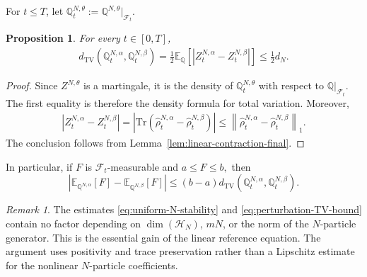 \documentclass[10pt,a4paper,reqno]{amsart}
\numberwithin{equation}{section}
\theoremstyle{plain}
\newtheorem{proposition}[theorem]{Proposition}
\theoremstyle{definition}
\theoremstyle{remark}
\newtheorem{remark}[theorem]{Remark}
\newcommand{\Tr}{\mathrm{Tr}}
\newcommand{\E}{\mathbb E}
\newcommand{\Q}{\mathbb Q}
\newcommand{\cF}{\mathcal F}
\newcommand{\HH}{\mathcal H}
\newcommand{\1}{\mathbf 1}
\begin{document}
For \(t\le T\), let
\(
  \Q_t^{N,\theta}
  :=
  \Q^{N,\theta}\big|_{\cF_t}.
\)

\begin{proposition}
\label{prop:TV-final}
For every \(t\in[0,T]\),
\begin{equation}
\begin{aligned}
  d_{\mathrm{TV}}
  \left(
    \Q_t^{N,\alpha},
    \Q_t^{N,\beta}
  \right)
  =
  \frac12
  \E_{\Q}
  \left[
    \left|
      Z_t^{N,\alpha}
      -
      Z_t^{N,\beta}
    \right|
  \right]
 \le
  \frac12d_N.
\end{aligned}
  \label{eq:perturbation-TV-bound}
\end{equation}
\end{proposition}

\begin{proof}
Since \(Z^{N,\theta}\) is a martingale, it is the density of
\(\Q_t^{N,\theta}\) with respect to \(\Q|_{\cF_t}\).  The first equality
is therefore the density formula for total variation.  Moreover,
\[
\begin{aligned}
  \left|
    Z_t^{N,\alpha}
    -
    Z_t^{N,\beta}
  \right|
  =
  \left|
    \Tr\left(
      \widehat\rho_t^{N,\alpha}
      -
      \widehat\rho_t^{N,\beta}
    \right)
  \right|\le
  \left\|
    \widehat\rho_t^{N,\alpha}
    -
    \widehat\rho_t^{N,\beta}
  \right\|_1.
\end{aligned}
\]
The conclusion follows from
Lemma~\ref{lem:linear-contraction-final}.
\end{proof}

In particular, if \(F\) is \(\cF_t\)-measurable and
\(
  a\le F\le b,
\)
then
\begin{equation}
  \left|
    \E_{\Q^{N,\alpha}}[F]
    -
    \E_{\Q^{N,\beta}}[F]
  \right|
  \le
  (b-a)
  d_{\mathrm{TV}}
  \left(
    \Q_t^{N,\alpha},
    \Q_t^{N,\beta}
  \right).
  \label{eq:TV-expectation}
\end{equation}

\begin{remark}
The estimates
\eqref{eq:uniform-N-stability} and
\eqref{eq:perturbation-TV-bound} contain no factor depending on
\(\dim(\HH_N)\), \(mN\), or the norm of the \(N\)-particle generator.
This is the essential gain of the linear reference equation.  The argument
uses positivity and trace preservation rather than a Lipschitz estimate for
the nonlinear \(N\)-particle coefficients.
\end{remark}

\end{document}
